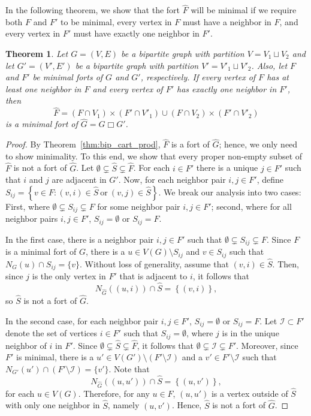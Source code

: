 \documentclass[twoside, 12pt]{article}
\newtheorem{theorem}{Theorem}[section]
\theoremstyle{definition}
\begin{document}
In the following theorem, we show that the fort $\hat{F}$ will be minimal if we require both $F$ and $F'$ to be minimal, every vertex in $F$ must have a neighbor in $F$, and every vertex in $F'$ must have exactly one neighbor in $F'$.
\begin{theorem}\label{thm:bip_cart_prod_minimal}
Let $G=(V,E)$ be a bipartite graph with partition $V=V_{1}\sqcup V_{2}$ and let $G'=(V',E')$ be a bipartite graph with partition $V'=V'_{1}\sqcup V'_{2}$.
Also, let $F$ and $F'$ be minimal forts of $G$ and $G'$, respectively.
If every vertex of $F$  has at least one neighbor in $F$ and every vertex of $F'$ has exactly one neighbor in $F'$, then 
\[
\hat{F}=\left(F\cap V_{1}\right)\times\left(F'\cap V'_{1}\right)\cup\left(F\cap V_{2}\right)\times\left(F'\cap V'_{2}\right)
\]
is a minimal fort of $\hat{G}=G\Box G'$. 
\end{theorem}
\begin{proof}
By Theorem~\ref{thm:bip_cart_prod}, $\hat{F}$ is a fort of $\hat{G}$; hence, we only need to show minimality.
To this end, we show that every proper non-empty subset of $\hat{F}$ is not a fort of $\hat{G}$.
Let $\emptyset\subsetneq\hat{S}\subsetneq\hat{F}$.
For each $i\in F'$ there is a unique $j\in F'$ such that $i$ and $j$ are adjacent in $G'$. 
Now, for each neighbor pair $i,j\in F'$, define $S_{ij}=\left\{v\in F\colon (v,i)\in\hat{S}~\textrm{or}~(v,j)\in\hat{S}\right\}$.
We break our analysis into two cases: First, where $\emptyset\subsetneq S_{ij}\subsetneq F$ for some neighbor pair $i,j\in F'$; second, where for all neighbor pairs $i,j\in F'$, $S_{ij}=\emptyset$ or $S_{ij}=F$. 

In the first case, there is a neighbor pair $i,j\in F'$ such that $\emptyset\subsetneq S_{ij}\subsetneq F$. 
Since $F$ is a minimal fort of $G$, there is a $u\in V(G)\setminus{S_{ij}}$ and $v\in S_{ij}$ such that $N_{G}(u)\cap S_{ij}=\{v\}$. 
Without loss of generality, assume that $(v,i)\in\hat{S}$.
Then, since $j$ is the only vertex in $F'$ that is adjacent to $i$, it follows that
\[
N_{\hat{G}}\left((u,i)\right)\cap\hat{S} = \left\{(v,i)\right\},
\]
so $\hat{S}$ is not a fort of $\hat{G}$.

In the second case, for each neighbor pair $i,j\in F'$, $S_{ij}=\emptyset$ or $S_{ij}=F$.
Let $\mathcal{I}\subset F'$ denote the set of vertices $i\in F'$ such that $S_{ij}=\emptyset$, where $j$ is in the unique neighbor of $i$ in $F'$. 
Since $\emptyset\subsetneq\hat{S}\subsetneq\hat{F}$, it follows that $\emptyset\subsetneq\mathcal{I}\subsetneq F'$.
Moreover, since $F'$ is minimal, there is a $u'\in V(G')\setminus\left(F'\setminus\mathcal{I}\right)$ and a $v'\in F'\setminus\mathcal{I}$ such that $N_{G'}(u')\cap\left(F'\setminus\mathcal{I}\right)=\{v'\}$.
Note that 
\[
N_{\hat{G}}\left((u,u')\right)\cap\hat{S} = \left\{(u,v')\right\},
\]
for each $u\in V(G)$.
Therefore, for any $u\in F$, $(u,u')$ is a vertex outside of $\hat{S}$ with only one neighbor in $\hat{S}$, namely $(u,v')$.
Hence, $\hat{S}$ is not a fort of $\hat{G}$. 
\end{proof}
\end{document}
